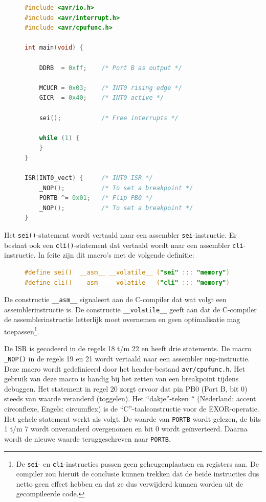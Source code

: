 \begin{figure}[!ht]
\begin{lstlisting}[language=C,caption=Voorbeeld van het gebruik van de INT0 interrupt service routine.,label=cod:intisrforint0]
#include <avr/io.h>
#include <avr/interrupt.h>
#include <avr/cpufunc.h>

int main(void) {
	
	DDRB  = 0xff;    /* Port B as output */
	
	MCUCR = 0x03;    /* INT0 rising edge */
	GICR  = 0x40;    /* INT0 active */
	
	sei();           /* Free interrupts */
	
    while (1) {
    }
}

ISR(INT0_vect) {     /* INT0 ISR */
	_NOP();          /* To set a breakpoint */
	PORTB ^= 0x01;   /* Flip PB0 */
	_NOP();          /* To set a breakpoint */
}
\end{lstlisting}
\end{figure}

Het \lstinline|sei()|-statement wordt vertaald naar een assembler
\lstinline|sei|-instructie. Er bestaat ook een \lstinline|cli()|-statement
dat vertaald wordt naar een assembler \lstinline|cli|-instructie.
In feite zijn dit macro's met de volgende definitie:

\begin{figure}[!ht]
\begin{lstlisting}[language=C,caption=Definitie van de sei()- en cli()-statements.,label=cod:intseiclidef]
#define sei()  __asm__ __volatile__ ("sei" ::: "memory")
#define cli()  __asm__ __volatile__ ("cli" ::: "memory")
\end{lstlisting}
\end{figure}

De constructie \lstinline|__asm__| signaleert aan de C-compiler dat wat
volgt een assemblerinstructie is. De constructie \lstinline|__volatile__|
geeft aan dat de C-compiler de assemblerinstructie letterlijk moet
overnemen en geen optimalisatie mag toepassen\footnote{De
\lstinline|sei|- en \lstinline|cli|-instructies passen geen
geheugenplaatsen en registers aan. De compiler zou hieruit de conclusie
kunnen trekken dat de beide instructies dus netto geen effect hebben en
dat ze dus verwijderd kunnen worden uit de gecompileerde code.}.

De ISR is gecodeerd in de regels 18 t/m 22 en heeft drie statements.
De macro \lstinline|_NOP()| in de regels 19 en 21 wordt vertaald
naar een assembler
\lstinline|nop|-instructie. Deze macro wordt gedefinieerd door het
header-bestand \lstinline|avr/cpufunc.h|. Het gebruik van deze macro
is handig bij het zetten van een breakpoint tijdens debuggen. Het
statement in regel 20 zorgt ervoor dat pin PB0 (Port B, bit 0) steeds
van waarde veranderd (toggelen). Het ``dakje''-teken \lstinline|^| 
(Nederland: accent circonflexe, Engels: circumflex) is de 
``C''-taalconstructie voor de EXOR-operatie. Het gehele statement
werkt als volgt. De waarde van \lstinline|PORTB| wordt gelezen,
de bits 1 t/m 7 wordt onveranderd overgenomen en bit 0 wordt
ge\"inverteerd. Daarna wordt de nieuwe waarde teruggeschreven naar
\lstinline|PORTB|.

